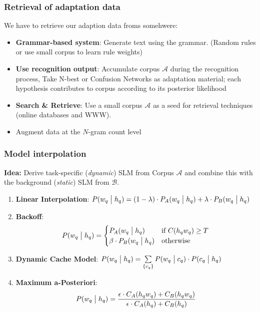 \subsubsection{Retrieval of adaptation data}
We have to retrieve our adaption data froms somehwere:
\begin{itemize}
    \item \textbf{Grammar-based system}: Generate text using the grammar. (Random rules or use small corpus to learn rule weights)
    \item \textbf{Use recognition output}: Accumulate corpus $\mathcal{A}$ during the recognition process, Take N-best or Confusion Networks as adaptation material;
each hypothesis contributes to corpus according to its posterior likelihood
    \item \textbf{Search \& Retrieve}: Use a small corpus $\mathcal{A}$ as a seed for retrieval techniques (online databases and WWW).
\item Augment data at the $N$-gram count level
\end{itemize}

\subsubsection{Model interpolation}
\textbf{Idea:} Derive task-specific (\emph{dynamic}) SLM from Corpus $\mathcal{A}$ and combine this with the background (\emph{static}) SLM from $\mathcal{B}$.
\begin{enumerate}
    \item \textbf{Linear Interpolation}: $P(w_q \bigm| h_q) = (1 - \lambda) \cdot P_A(w_q \bigm| h_q) + \lambda \cdot P_B(w_q \bigm| h_q)$
    \item \textbf{Backoff}:
        \[
            P(w_q \bigm| h_q) = \begin{cases}
                P_A(w_q \bigm| h_q) & \mbox{if } C(h_q w_q) \geq T \\
                \beta \cdot P_B(w_q \bigm| h_q) & \mbox{otherwise}
            \end{cases}
        \]
    \item \textbf{Dynamic Cache Model}: $P(w_q \bigm| h_q) = \sum\limits_{\left\{c_q\right\}} P(w_q \bigm| c_q) \cdot P(c_q \bigm| h_q)$
    \item \textbf{Maximum a-Posteriori}:
        \[
            P(w_q \bigm| h_q) = \frac{\epsilon \cdot C_A(h_qw_q) + C_B(h_qw_q)}{\epsilon \cdot C_A(h_q) + C_B(h_q)}
        \]
\end{enumerate}

